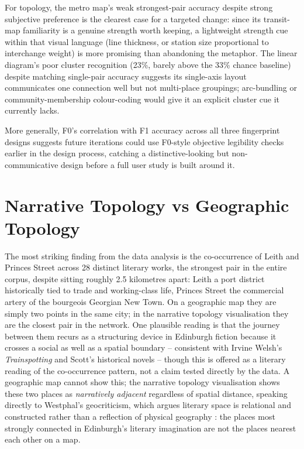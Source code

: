\documentclass[logo,msc]{infthesis}
\begin{document}
For topology, the metro map's weak strongest-pair accuracy despite strong subjective preference is the clearest case for a targeted change: since its transit-map familiarity is a genuine strength worth keeping, a lightweight strength cue within that visual language (line thickness, or station size proportional to interchange weight) is more promising than abandoning the metaphor. The linear diagram's poor cluster recognition (23\%, barely above the 33\% chance baseline) despite matching single-pair accuracy suggests its single-axis layout communicates one connection well but not multi-place groupings; arc-bundling or community-membership colour-coding would give it an explicit cluster cue it currently lacks.

More generally, F0's correlation with F1 accuracy across all three fingerprint designs suggests future iterations could use F0-style objective legibility checks earlier in the design process, catching a distinctive-looking but non-communicative design before a full user study is built around it.
 
\section{Narrative Topology vs Geographic Topology}
 
The most striking finding from the data analysis is the co-occurrence of Leith and Princes Street across 28 distinct literary works, the strongest pair in the entire corpus, despite sitting roughly 2.5 kilometres apart: Leith a port district historically tied to trade and working-class life, Princes Street the commercial artery of the bourgeois Georgian New Town. On a geographic map they are simply two points in the same city; in the narrative topology visualisation they are the closest pair in the network. One plausible reading is that the journey between them recurs as a structuring device in Edinburgh fiction because it crosses a social as well as a spatial boundary -- consistent with Irvine Welsh's \textit{Trainspotting} and Scott's historical novels -- though this is offered as a literary reading of the co-occurrence pattern, not a claim tested directly by the data. A geographic map cannot show this; the narrative topology visualisation shows these two places as \emph{narratively adjacent} regardless of spatial distance, speaking directly to Westphal's geocriticism, which argues literary space is relational and constructed rather than a reflection of physical geography \cite{westphal2011}: the places most strongly connected in Edinburgh's literary imagination are not the places nearest each other on a map.
\end{document}
